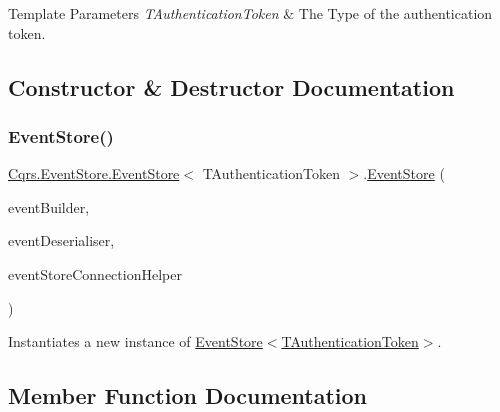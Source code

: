 \begin{DoxyTemplParams}{Template Parameters}
{\em T\+Authentication\+Token} & The Type of the authentication token.\\
\hline
\end{DoxyTemplParams}


\subsection{Constructor \& Destructor Documentation}
\mbox{\label{classCqrs_1_1EventStore_1_1EventStore_ab48ad2c9d72780ae3a662e213498f194_ab48ad2c9d72780ae3a662e213498f194}} 
\subsubsection{\texorpdfstring{Event\+Store()}{EventStore()}}
{\footnotesize\ttfamily \hyperlink{classCqrs_1_1EventStore_1_1EventStore}{Cqrs.\+Event\+Store.\+Event\+Store}$<$ T\+Authentication\+Token $>$.\hyperlink{classCqrs_1_1EventStore_1_1EventStore}{Event\+Store} (\begin{DoxyParamCaption}\item[{\hyperlink{interfaceCqrs_1_1EventStore_1_1IEventBuilder}{I\+Event\+Builder}$<$ T\+Authentication\+Token $>$}]{event\+Builder,  }\item[{\hyperlink{interfaceCqrs_1_1EventStore_1_1IEventDeserialiser}{I\+Event\+Deserialiser}$<$ T\+Authentication\+Token $>$}]{event\+Deserialiser,  }\item[{\hyperlink{interfaceCqrs_1_1EventStore_1_1IEventStoreConnectionHelper}{I\+Event\+Store\+Connection\+Helper}}]{event\+Store\+Connection\+Helper }\end{DoxyParamCaption})}



Instantiates a new instance of \hyperlink{classCqrs_1_1EventStore_1_1EventStore_ab48ad2c9d72780ae3a662e213498f194_ab48ad2c9d72780ae3a662e213498f194}{Event\+Store$<$\+T\+Authentication\+Token$>$}. 



\subsection{Member Function Documentation}
\mbox{\label{classCqrs_1_1EventStore_1_1EventStore_a60e5974f82d907cad6e74ea29fb13e71_a60e5974f82d907cad6e74ea29fb13e71}} 
